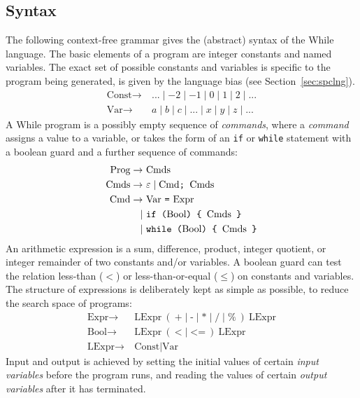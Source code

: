 \documentclass[a4paper,twoside,notitlepage]{report}
\newcommand{\ttt}{\texttt}
\newcommand{\trm}{\textrm}
\begin{document}
\subsection{Syntax}
The following context-free grammar gives the (abstract) syntax of the While 
language. The basic elements of a program are integer constants and named 
variables. The exact set of possible constants and variables is specific to 
the program being generated, is given by the language bias (see 
Section~\ref{sec:spclng}).
\begin{align*}
   \trm{Const} \to\ & ... \mid -2 \mid -1 \mid 0 \mid 1 \mid 2 \mid ...
\\ \trm{Var}   \to\ & a \mid b \mid c \mid ... \mid x \mid y \mid z \mid ...
\end{align*}
A While program is a possibly empty sequence of \emph{commands}, where a 
\emph{command} assigns a value to a variable, or takes the form of an \ttt{if} 
or \ttt{while} statement with a boolean guard and a further sequence of 
commands:
\begin{align*}
   \trm{Prog}  \to\ & \trm{Cmds}
\\ \trm{Cmds}  \to\ & \varepsilon \mid \trm{Cmd} \ttt{; } \trm{Cmds}
\\ \trm{Cmd}   \to\ & \trm{Var} \ \ttt{=} \ \trm{Expr}
\\            \mid\ & \ttt{if (} \trm{Bool} \ttt{) \char`\{\ } \trm{Cmds} \ttt{ \char`\}}
\\            \mid\ & \ttt{while (} \trm{Bool} \ttt{) \char`\{\ } \trm{Cmds} \ttt{ \char`\}}
\end{align*}
An arithmetic expression is a sum, difference, product, integer quotient, or 
integer remainder of two constants and/or variables. A boolean guard can test 
the relation less-than ($<$) or less-than-or-equal ($\leq$) on constants and 
variables. The structure of expressions is deliberately kept as simple as 
possible, to reduce the search space of programs:
\begin{align*}
   \trm{Expr}  \to\ & \trm{LExpr}\ (\ \ttt{+} \mid \ttt{-} \mid \ttt{*} \mid
                                      \ttt{/} \mid \ttt{\%} \ )\ \trm{LExpr}
\\ \trm{Bool}  \to\ & \trm{LExpr}\ (\ \ttt{<} \mid \ttt{<=}\ )\ \trm{LExpr}
\\ \trm{LExpr} \to\ & \trm{Const} \mid \trm{Var}
\end{align*}
Input and output is achieved by setting the initial values of certain 
\emph{input variables} before the program runs, and reading the values of 
certain \emph{output variables} after it has terminated.
\end{document}
